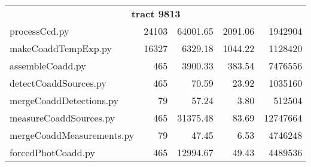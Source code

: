 \begin{table}
\begin{longtable}{lrrrr}
        \hline
        \multicolumn{5}{c}{\textbf{tract 9813}} \\
        processCcd.py & 24103 & 64001.65 & 2091.06 &   1942904 \\
        makeCoaddTempExp.py & 16327 & 6329.18 & 1044.22 &  1128420 \\
        assembleCoadd.py & 465 & 3900.33 & 383.54 &   7476556 \\
        detectCoaddSources.py & 465 & 70.59 & 23.92 & 1035160 \\
        mergeCoaddDetections.py & 79 & 57.24 & 3.80 &   512504 \\
        measureCoaddSources.py & 465 & 31375.48 & 83.69 & 12747664 \\
        mergeCoaddMeasurements.py & 79 &  47.45 & 6.53 &   4746248 \\
        forcedPhotCoadd.py & 465 & 12994.67 & 49.43 &   4489536 \\
        \hline\hline
    \end{longtable}
\end{table}
